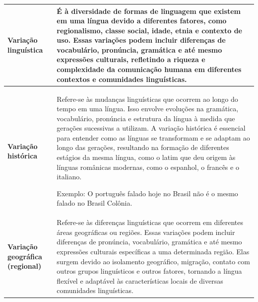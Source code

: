 \begin{longtable}[]{@{}ll@{}}
\toprule
\begin{minipage}[b]{0.46\columnwidth}\raggedright
\textbf{Variação linguística}\strut
\end{minipage} & \begin{minipage}[b]{0.46\columnwidth}\raggedright

É à diversidade de formas de linguagem que existem em uma língua devido a diferentes fatores, como regionalismo, classe social, idade, etnia e contexto de uso. Essas variações podem incluir diferenças de vocabulário, pronúncia, gramática e até mesmo expressões culturais, refletindo a riqueza e complexidade da comunicação humana em diferentes contextos e comunidades linguísticas.\strut
\end{minipage}\tabularnewline
\midrule
\endhead
\begin{minipage}[t]{0.46\columnwidth}\raggedright
\textbf{Variação histórica}\strut
\end{minipage} & \begin{minipage}[t]{0.46\columnwidth}\raggedright
Refere-se às mudanças linguísticas que ocorrem ao longo do tempo em uma língua. Isso envolve evoluções na gramática, vocabulário, pronúncia e estrutura da língua à medida que gerações sucessivas a utilizam. A variação histórica é essencial para entender como as línguas se transformam e se adaptam ao longo das gerações, resultando na formação de diferentes estágios da mesma língua, como o latim que deu origem às línguas românicas modernas, como o espanhol, o francês e o italiano.

Exemplo: O português falado hoje no Brasil não é o mesmo falado no Brasil Colônia.\strut
\end{minipage}\tabularnewline
\begin{minipage}[t]{0.46\columnwidth}\raggedright
\textbf{Variação geográfica (regional)}\strut
\end{minipage} & \begin{minipage}[t]{0.46\columnwidth}\raggedright
Refere-se às diferenças linguísticas que ocorrem em diferentes áreas geográficas ou regiões. Essas variações podem incluir diferenças de pronúncia, vocabulário, gramática e até mesmo expressões culturais específicas a uma determinada região. Elas surgem devido ao isolamento geográfico, migração, contato com outros grupos linguísticos e outros fatores, tornando a língua flexível e adaptável às características locais de diversas comunidades linguísticas.


\end{minipage}
\end{longtable}
